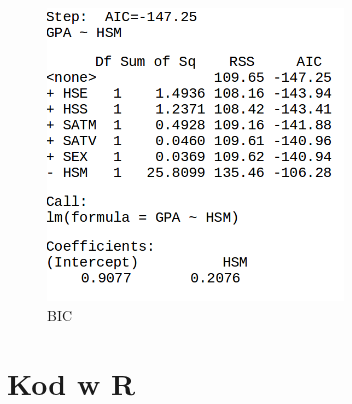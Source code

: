 \documentclass[9pt]{article}  %
\begin{document}
    \begin{figure}[H]
      \centering
      \includegraphics[width=0.7\textwidth]{162.png}
      \caption{BIC}
    \end{figure} 

  \section{Kod w R}
  
\end{document}
